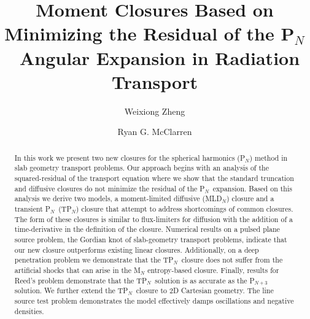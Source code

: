 \documentclass[review]{elsarticle}
\newcommand{\pn}{P$_N$}
\newcommand{\dn}{D$_N$}
\newcommand{\tp}[1]{TP$_{#1}$}
\newcommand{\TAMU}{Texas A\&M University}
\begin{document}
\begin{frontmatter}

\title{Moment Closures Based on Minimizing the Residual of the \pn~Angular Expansion in Radiation Transport}%

\author[mymainaddress]{Weixiong Zheng}

\author[mymainaddress]{Ryan G. McClarren}

\address[mymainaddress]{Nuclear Engineering, \TAMU,~College Station, TX 77843-3133}

\begin{abstract}
	In this work we present  two new closures for the spherical harmonics (\pn) method in slab geometry transport problems. Our approach begins with an analysis of the squared-residual of the transport equation where we show that the standard truncation and diffusive closures do not minimize the residual of the \pn~expansion.  Based on this analysis we derive two models, a moment-limited diffusive (ML\dn) closure and a transient \pn~(\tp{N}) closure that attempt to address shortcomings of common closures.  The form of these closures is similar to flux-limiters for diffusion with the addition of a time-derivative in the definition of the closure.  Numerical results on a pulsed plane source problem, the Gordian knot of slab-geometry transport problems, indicate that our new closure outperforms existing linear closures.  Additionally, on a deep penetration problem we demonstrate that the \tp{N}~closure does not suffer from the artificial shocks that can arise in the M$_N$ entropy-based closure. Finally, results for Reed's problem demonstrate that the \tp{N}~solution is as accurate as the P$_{N+3}$ solution. {We further extend the T\pn\ closure to 2D Cartesian geometry. The line source test problem demonstrates the model effectively damps oscillations and negative densities.}


\end{abstract}
\end{frontmatter}
\end{document}
